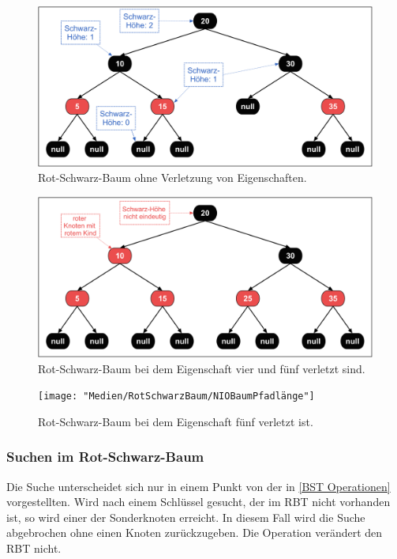 \documentclass[a4paper,12pt]{article}
\begin{document}
\begin{figure}[h]
	\centering
	\includegraphics[width= 1\textwidth]{"Medien/RotSchwarzBaum/IOBaum"}
	\caption{Rot-Schwarz-Baum ohne Verletzung von Eigenschaften. }
	\label{fig:IOBaum}
\end{figure}
\begin{figure}[h]
	\centering
	\includegraphics[width= 1\textwidth]{"Medien/RotSchwarzBaum/NIOBaumZweiRote"}
	\caption{Rot-Schwarz-Baum bei dem Eigenschaft vier und fünf verletzt sind. }
	\label{fig:NIOBaumZweiRote}
\end{figure}
\begin{figure}[h]
	\centering
	\texttt{[image: "Medien/RotSchwarzBaum/NIOBaumPfadlänge"]}
	\caption{Rot-Schwarz-Baum bei dem Eigenschaft fünf verletzt ist.  }
	\label{fig:NIOBaumPfadlänge}
\end{figure}

\subsubsection{Suchen im Rot-Schwarz-Baum}
Die Suche unterscheidet sich nur in einem Punkt von der in \ref{BST Operationen} vorgestellten. Wird nach einem Schlüssel gesucht, der im RBT nicht vorhanden ist, so wird einer der Sonderknoten erreicht. In diesem Fall wird die Suche abgebrochen ohne einen Knoten zurückzugeben. Die Operation verändert den RBT nicht. 
\end{document}
